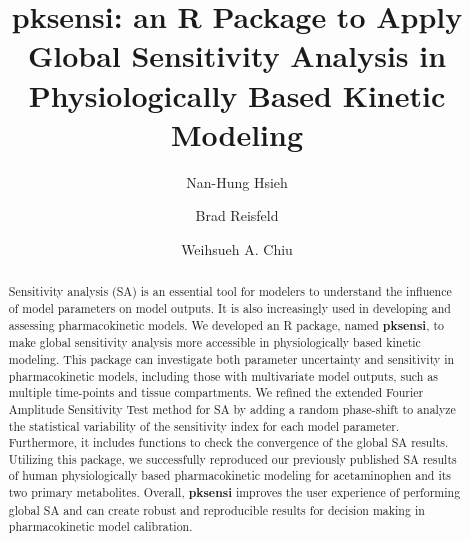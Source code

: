 \documentclass[preprint,12pt, a4paper]{elsarticle}
\begin{document}
\begin{frontmatter}



\title{pksensi: an R Package to Apply Global Sensitivity Analysis in
Physiologically Based Kinetic Modeling}


\author[1]{Nan-Hung Hsieh}
\author[2]{Brad Reisfeld}
\author[1]{Weihsueh A. Chiu}

\address[1]{
Veterinary Integrative Biosciences, College of Veterinary Medicine and
Biomedical Sciences, Texas A\&M University, College Station, TX, USA\\
}
\address[2]{
Chemical and Biological Engineering and School of Biomedical
Engineering, Colorado State University, Fort Collins, CO, USA\\
}


\begin{abstract}
Sensitivity analysis (SA) is an essential tool for modelers to understand the influence of model parameters on model outputs. 
It is also increasingly used in developing and assessing pharmacokinetic models.
We developed an R package, named \textbf{pksensi}, to make global
sensitivity analysis more accessible in physiologically based
kinetic modeling. This package can investigate both parameter
uncertainty and sensitivity in pharmacokinetic models, including those
with multivariate model outputs, such as multiple time-points and tissue
compartments. We refined the extended Fourier Amplitude Sensitivity Test
method for SA by adding a random phase-shift to analyze the statistical
variability of the sensitivity index for each model parameter.
Furthermore, it includes functions to check the convergence of the
global SA results. Utilizing this package, we successfully
reproduced our previously published SA results of human physiologically
based pharmacokinetic modeling for acetaminophen and its two primary
metabolites. Overall, \textbf{pksensi} improves the user experience of
performing global SA and can create robust and reproducible results for
decision making in pharmacokinetic model calibration.


\end{abstract}
\end{frontmatter}
\end{document}
